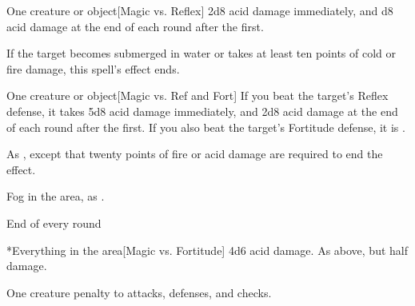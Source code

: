 \spellrng{\rngmed}
\begin{spelltarget}{One creature or object}[Magic vs. Reflex]
    \spellsuccess 2d8 acid damage immediately, and d8 acid damage at the end of each round after the first.
\end{spelltarget}
\spellnotes If the target becomes submerged in water or takes at least ten points of cold or fire damage, this spell's effect ends.

\spellrng{\rngfar}
\begin{spelltarget}{One creature or object}[Magic vs. Ref and Fort]
    \spellsuccess If you beat the target's Reflex defense, it takes 5d8 acid damage immediately, and 2d8 acid damage at the end of each round after the first. If you also beat the target's Fortitude defense, it is \vulnerable.
\end{spelltarget}
\spellnotes As , except that twenty points of fire or acid damage are required to end the effect.

\spelldur{\durshort}
\spellline
\spelleffect Fog in the area, as .
\begin{spelltrigger}{End of every round}
    \begin{spelltarget}*{Everything in the area}[Magic vs. Fortitude]
        \spellsuccess 4d6 acid damage.
        \spellfailure As above, but half damage.
    \end{spelltarget}
\end{spelltrigger}

\spellrng{\rngmed}
\spelldur{\durshort}
\begin{spelltarget}{One creature}
    \spelleffect {} penalty to attacks, defenses, and checks.
\end{spelltarget}

